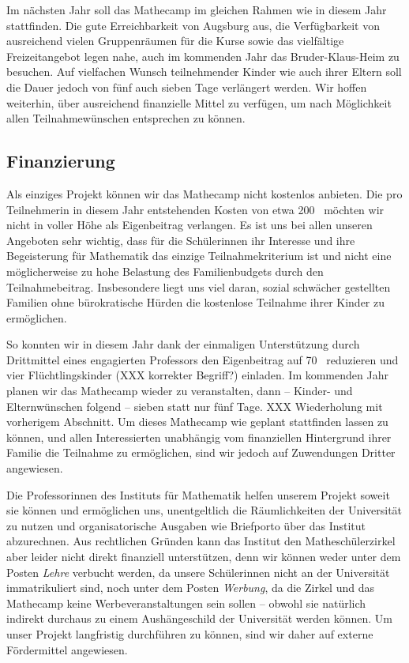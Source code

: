 \documentclass[12pt]{zettel}
\newcommand{\twopics}[2]{%
  \begin{figure}[b]
    \makebox[\textwidth][c]{%
      \texttt{[image: impressionen/\#1]}%
      \hspace*{1cm}%
      \texttt{[image: impressionen/\#2]}%
    }
  \end{figure}
}
\begin{document}
Im nächsten Jahr soll das Mathecamp im gleichen Rahmen wie in diesem Jahr stattfinden. Die gute Erreichbarkeit von Augsburg aus, die Verfügbarkeit von ausreichend vielen
Gruppenräumen für die Kurse sowie das vielfältige Freizeitangebot legen nahe, auch im kommenden Jahr das Bruder-Klaus-Heim zu besuchen. Auf vielfachen Wunsch teilnehmender Kinder wie
auch ihrer Eltern soll die Dauer jedoch von fünf auch sieben Tage verlängert werden. Wir hoffen weiterhin, über ausreichend finanzielle Mittel zu verfügen, um nach Möglichkeit allen
Teilnahmewünschen entsprechen zu können.

\subsection{Finanzierung}

Als einziges Projekt können wir das Mathecamp nicht kostenlos anbieten. Die pro Teilnehmerin in diesem
Jahr entstehenden Kosten von etwa 200~\texteuro{} möchten wir nicht in voller Höhe als Eigenbeitrag verlangen. Es ist uns bei allen unseren Angeboten sehr wichtig, dass für die
Schülerinnen ihr Interesse und ihre Begeisterung für Mathematik das einzige Teilnahmekriterium ist und nicht eine möglicherweise zu hohe Belastung des Familienbudgets durch den
Teilnahmebeitrag. Insbesondere liegt uns viel daran, sozial schwächer gestellten Familien ohne bürokratische Hürden die kostenlose Teilnahme ihrer Kinder zu ermöglichen.

\twopics{klein-10}{klein-03}

So konnten wir in diesem Jahr dank der einmaligen Unterstützung durch Drittmittel eines engagierten Professors den Eigenbeitrag auf 70~\texteuro{} reduzieren und vier Flüchtlingskinder (XXX korrekter Begriff?) einladen.
Im kommenden Jahr planen wir das Mathecamp wieder zu veranstalten, dann -- Kinder- und Elternwünschen folgend -- sieben statt nur fünf Tage. XXX Wiederholung mit vorherigem Abschnitt. Um dieses Mathecamp wie geplant
stattfinden lassen zu können, und allen Interessierten unabhängig vom finanziellen Hintergrund ihrer Familie die Teilnahme zu ermöglichen, sind wir jedoch auf Zuwendungen
Dritter angewiesen.

Die Professorinnen des Instituts für Mathematik helfen unserem Projekt soweit sie können
und ermöglichen uns, unentgeltlich die Räumlichkeiten der Universität zu nutzen
und organisatorische Ausgaben wie Briefporto über das Institut abzurechnen.
Aus rechtlichen Gründen kann das Institut den Matheschülerzirkel aber leider nicht
direkt finanziell unterstützen, denn wir können weder unter dem Posten
\emph{Lehre} verbucht werden, da unsere Schülerinnen nicht an der Universität
immatrikuliert sind, noch unter dem Posten \emph{Werbung}, da die Zirkel und
das Mathecamp keine Werbeveranstaltungen sein sollen -- obwohl sie natürlich indirekt
durchaus zu einem Aushängeschild der Universität werden können.
Um unser Projekt langfristig durchführen zu können, sind wir daher auf externe
Fördermittel angewiesen.
\end{document}
